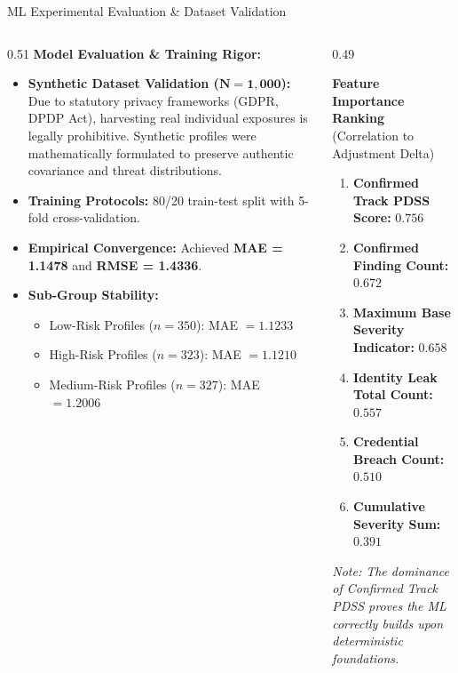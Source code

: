 \documentclass[aspectratio=169,10pt]{beamer}
\begin{document}
\begin{frame}{ML Experimental Evaluation \& Dataset Validation}
  \footnotesize
  \begin{columns}[T]
    \begin{column}{0.51\textwidth}
      \textbf{Model Evaluation \& Training Rigor:}
      \begin{itemize}\setlength{\itemsep}{0.12cm}
        \item \textbf{Synthetic Dataset Validation ($\mathbf{N=1,000}$):} Due to statutory privacy frameworks (GDPR, DPDP Act), harvesting real individual exposures is legally prohibitive. Synthetic profiles were mathematically formulated to preserve authentic covariance and threat distributions.
        \item \textbf{Training Protocols:} 80/20 train-test split with 5-fold cross-validation.
        \item \textbf{Empirical Convergence:} Achieved \textbf{MAE = 1.1478} and \textbf{RMSE = 1.4336}.
        \item \textbf{Sub-Group Stability:}
          \begin{itemize}\setlength{\itemsep}{0.06cm}
            \item \scriptsize Low-Risk Profiles ($n=350$): MAE $= 1.1233$
            \item \scriptsize High-Risk Profiles ($n=323$): MAE $= 1.1210$
            \item \scriptsize Medium-Risk Profiles ($n=327$): MAE $= 1.2006$
          \end{itemize}
      \end{itemize}
    \end{column}
    \begin{column}{0.49\textwidth}
      \begin{block}{\centering \textbf{Feature Importance Ranking}\\ (Correlation to Adjustment Delta)}
        \scriptsize
        \begin{enumerate}\setlength{\itemsep}{0.12cm}
          \item \textbf{Confirmed Track PDSS Score:} $0.756$
          \item \textbf{Confirmed Finding Count:} $0.672$
          \item \textbf{Maximum Base Severity Indicator:} $0.658$
          \item \textbf{Identity Leak Total Count:} $0.557$
          \item \textbf{Credential Breach Count:} $0.510$
          \item \textbf{Cumulative Severity Sum:} $0.391$
        \end{enumerate}
      \end{block}
      \vspace{0.10cm}
      \scriptsize \textit{Note: The dominance of Confirmed Track PDSS proves the ML correctly builds upon deterministic foundations.}
    \end{column}
  \end{columns}
\end{frame}
\end{document}
